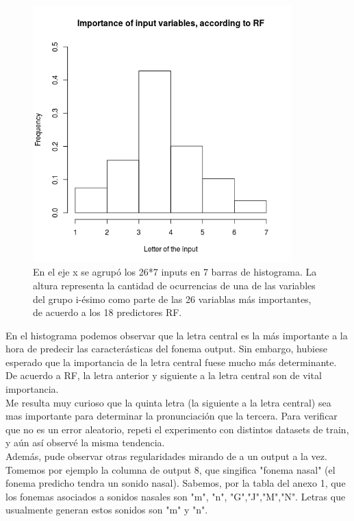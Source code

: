 \documentclass[paper=a4, fontsize=11pt]{scrartcl} %
\numberwithin{equation}{section} %
\numberwithin{figure}{section} %
\numberwithin{table}{section} %
\begin{document}
\begin{figure}[h!]
\centering
\includegraphics[width=100mm]{imgs/variable_importance.jpg}
\caption{En el eje x se agrupó los 26*7 inputs en 7 barras de histograma. La altura representa la cantidad de ocurrencias de una de las variables del grupo i-ésimo como parte de las 26 variablas más importantes, de acuerdo a los 18 predictores RF.}
\label{fig:results}

\end{figure}

En el histograma podemos observar que la letra central es la más importante a la hora de predecir las caracterásticas del fonema output. Sin embargo, hubiese esperado que la importancia de la letra central fuese mucho más determinante. De acuerdo a RF, la letra anterior y siguiente a la letra central son de vital importancia. \\

Me resulta muy curioso que la quinta letra (la siguiente a la letra central) sea mas importante para determinar la pronunciación que la tercera. Para verificar que no es un error aleatorio, repeti el experimento con distintos datasets de train, y aún así observé la misma tendencia. \\

Además, pude observar otras regularidades mirando de a un output a la vez. Tomemos por ejemplo la columna de output 8, que singifica "fonema nasal" (el fonema predicho tendra un sonido nasal). Sabemos, por la tabla del anexo 1, que los fonemas asociados a sonidos nasales son "m", "n", "G","J","M","N". Letras que usualmente generan estos sonidos son "m" y "n". \\
\end{document}
